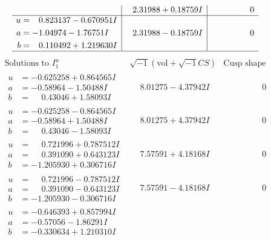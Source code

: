 \documentclass[1p]{elsarticle_modified}
\theoremstyle{definition}
\newcommand{\I}{\sqrt{-1}}
\begin{document}
$$\begin{array}{c|c|c}
 & \phantom{-}2.31988 + 0.18759 I & \phantom{-0.000000 } 0 \\ \hline\begin{aligned}
u &= \phantom{-}0.823137 - 0.670951 I \\
a &= -1.04974 - 1.76751 I \\
b &= \phantom{-}0.110492 + 1.219630 I\end{aligned}
 & \phantom{-}2.31988 - 0.18759 I & \phantom{-0.000000 } 0\\
 \hline 
 \end{array}$$\newpage$$\begin{array}{c|c|c}  
\text{Solutions to }I^u_{1}& \I (\text{vol} + \sqrt{-1}CS) & \text{Cusp shape}\\
 \hline 
\begin{aligned}
u &= -0.625258 + 0.864565 I \\
a &= -0.58964 - 1.50488 I \\
b &= \phantom{-}0.43046 + 1.58093 I\end{aligned}
 & \phantom{-}8.01275 - 4.37942 I & \phantom{-0.000000 } 0 \\ \hline\begin{aligned}
u &= -0.625258 - 0.864565 I \\
a &= -0.58964 + 1.50488 I \\
b &= \phantom{-}0.43046 - 1.58093 I\end{aligned}
 & \phantom{-}8.01275 + 4.37942 I & \phantom{-0.000000 } 0 \\ \hline\begin{aligned}
u &= \phantom{-}0.721996 + 0.787512 I \\
a &= \phantom{-}0.391090 + 0.643123 I \\
b &= -1.205930 + 0.306716 I\end{aligned}
 & \phantom{-}7.57591 + 4.18168 I & \phantom{-0.000000 } 0 \\ \hline\begin{aligned}
u &= \phantom{-}0.721996 - 0.787512 I \\
a &= \phantom{-}0.391090 - 0.643123 I \\
b &= -1.205930 - 0.306716 I\end{aligned}
 & \phantom{-}7.57591 - 4.18168 I & \phantom{-0.000000 } 0 \\ \hline\begin{aligned}
u &= -0.646393 + 0.857994 I \\
a &= -0.57056 - 1.86291 I \\
b &= -0.330634 + 1.210310 I\end{aligned}

\end{array}$$
\end{document}
